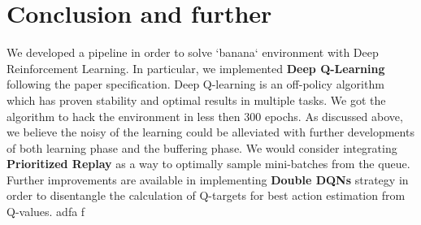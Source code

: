 \documentclass[11pt]{article}
\begin{document}
\section{Conclusion and further}
\label{sec:orgb834fbf}
We developed a pipeline in order to solve `banana` environment with Deep
Reinforcement Learning. In particular, we implemented \textbf{Deep Q-Learning}
following the paper specification. Deep Q-learning is an off-policy algorithm
which has proven stability and optimal results in multiple tasks. We got the
algorithm to hack the environment in less then 300 epochs. As discussed above,
we believe the noisy of the learning could be alleviated with further
developments of both learning phase and the buffering phase. We would consider
integrating \textbf{Prioritized Replay} as a way to optimally sample mini-batches from
the queue. Further improvements are available in implementing \textbf{Double DQNs}
strategy in order to disentangle the calculation of Q-targets for best action
estimation from Q-values.  adfa  f
\end{document}
